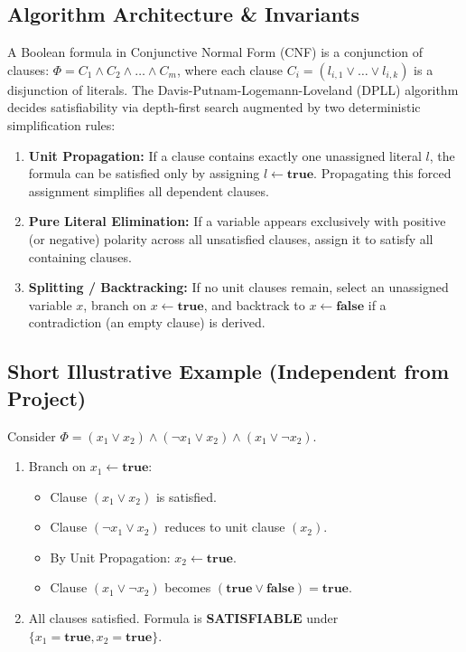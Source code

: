 \subsection{Algorithm Architecture \& Invariants}
A Boolean formula in Conjunctive Normal Form (CNF) is a conjunction of clauses: $\Phi = C_1 \land C_2 \land \dots \land C_m$, where each clause $C_i = (l_{i, 1} \lor \dots \lor l_{i, k})$ is a disjunction of literals.
The Davis-Putnam-Logemann-Loveland (DPLL) algorithm decides satisfiability via depth-first search augmented by two deterministic simplification rules:
\begin{enumerate}
    \item \textbf{Unit Propagation:} If a clause contains exactly one unassigned literal $l$, the formula can be satisfied only by assigning $l \gets \textbf{true}$. Propagating this forced assignment simplifies all dependent clauses.
    \item \textbf{Pure Literal Elimination:} If a variable appears exclusively with positive (or negative) polarity across all unsatisfied clauses, assign it to satisfy all containing clauses.
    \item \textbf{Splitting / Backtracking:} If no unit clauses remain, select an unassigned variable $x$, branch on $x \gets \textbf{true}$, and backtrack to $x \gets \textbf{false}$ if a contradiction (an empty clause) is derived.
\end{enumerate}

\subsection{Short Illustrative Example (Independent from Project)}
Consider $\Phi = (x_1 \lor x_2) \land (\neg x_1 \lor x_2) \land (x_1 \lor \neg x_2)$.
\begin{enumerate}
    \item Branch on $x_1 \gets \textbf{true}$:
    \begin{itemize}
        \item Clause $(x_1 \lor x_2)$ is satisfied.
        \item Clause $(\neg x_1 \lor x_2)$ reduces to unit clause $(x_2)$.
        \item By Unit Propagation: $x_2 \gets \textbf{true}$.
        \item Clause $(x_1 \lor \neg x_2)$ becomes $(\textbf{true} \lor \textbf{false}) = \textbf{true}$.
    \end{itemize}
    \item All clauses satisfied. Formula is \textbf{SATISFIABLE} under $\{x_1 = \textbf{true}, x_2 = \textbf{true}\}$.
\end{enumerate}

